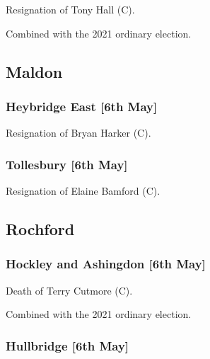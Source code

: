 \documentclass[a4paper,openany]{book}
\begin{document}
\begin{resultsiii}

Resignation of Tony Hall (C).

Combined with the 2021 ordinary election.

\subsection*{Maldon}

\subsubsection*{Heybridge East \hspace*{\fill}\nolinebreak[1]%
	\enspace\hspace*{\fill}
	[6th May]}


Resignation of Bryan Harker (C).

\subsubsection*{Tollesbury \hspace*{\fill}\nolinebreak[1]%
	\enspace\hspace*{\fill}
	[6th May]}


Resignation of Elaine Bamford (C).

\subsection*{Rochford}

\subsubsection*{Hockley and Ashingdon \hspace*{\fill}\nolinebreak[1]%
	\enspace\hspace*{\fill}
	[6th May]}


Death of Terry Cutmore (C).

Combined with the 2021 ordinary election.

\subsubsection*{Hullbridge \hspace*{\fill}\nolinebreak[1]%
	\enspace\hspace*{\fill}
	[6th May]}


\end{resultsiii}
\end{document}
